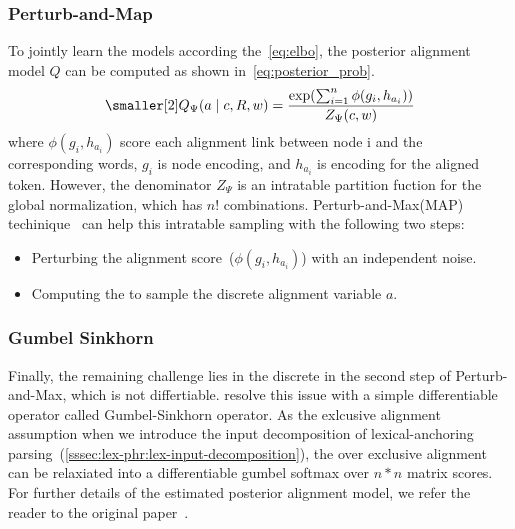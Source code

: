 \subsubsection{Perturb-and-Map}
\label{sssec:lex-phr:perturb-and-map}
To jointly learn the models according the~\autoref{eq:elbo}, the
posterior alignment model $Q$ can be computed as shown
in~\autoref{eq:posterior_prob}.
\begin{equation}
  \label{eq:posterior_prob}
\begin{aligned} \smaller[2]
Q_{\Psi}(a\mid c, R,w)= \frac{\exp(\sum_{i=1}^{n} \phi(g_{i}, h_{a_{i}}))} {Z_{\Psi}(c,w)}
\end{aligned}
\end{equation}
where $\phi(g_{i}, h_{a_{i}})$ score each alignment link between node i
and the corresponding words, $g_{i}$ is node encoding, and $h_{a_{i}}$
is encoding for the aligned token. However, the denominator $Z_{\Psi}$ is
an intratable partition fuction for the global normalization, which
has $n!$ combinations. Perturb-and-Max(MAP)
techinique~\cite{papandreouperturb} can help this intratable sampling
with the following two steps:
\begin{itemize}
\item Perturbing the alignment score~($\phi(g_{i}, h_{a_{i}})$) with an
  independent noise.
\item Computing the  to sample the discrete alignment
  variable $a$.
\end{itemize}

\subsubsection{Gumbel Sinkhorn}
\label{sssec:lex-phr:gumbel-sinkhorn}
Finally, the remaining challenge lies in the discrete  in
the second step of Perturb-and-Max, which is not differtiable.
\citet{mena2018learning} resolve this issue with a simple
differentiable operator called Gumbel-Sinkhorn operator. As the
exlcusive alignment assumption when we introduce the input
decomposition of lexical-anchoring
parsing~(\autoref{sssec:lex-phr:lex-input-decomposition}), the
 over exclusive alignment can be relaxiated into a
differentiable gumbel softmax over $n*n$ matrix scores. For further
details of the estimated posterior alignment model, we refer the
reader to the original paper~\citep{mena2018learning,lyu2018amr}.

